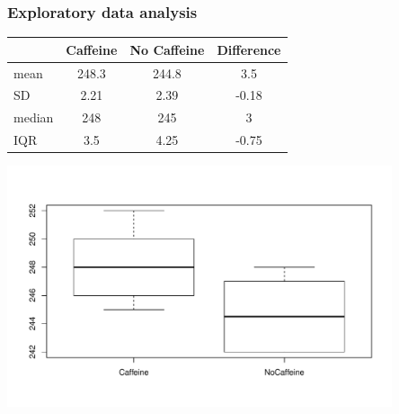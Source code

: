 \documentclass[slidestop,compress,mathserif,11pt,t,professionalfonts,xcolor=table]{beamer}
\begin{document}
\begin{frame}
\frametitle{Exploratory data analysis}

{
\begin{center}
{\footnotesize
\begin{tabular}{l | c | c | c}
\hline
		& Caffeine	& No Caffeine	& Difference \\
\hline
mean	&  248.3		& 244.8 		& 3.5 \\
SD		& 2.21		& 2.39 		& -0.18 \\
median	& 248		& 245 		& 3 \\
IQR		& 3.5			& 4.25		& -0.75 \\
\hline
\end{tabular}
}
\end{center}
}

\vspace{-1cm}

\begin{center}
\includegraphics[width=0.85\textwidth]{figures/caffeine/caffeinetaps_box.pdf}
\end{center}

\end{frame}

\end{document}

